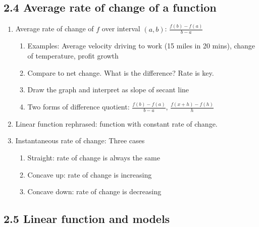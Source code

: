 \documentclass{article}
\newcommand{\ds}{\displaystyle}
\begin{document}
\subsection{2.4 Average rate of change of a function}

\begin{enumerate}
\item Average rate of change of $f$ over interval $(a,b)$: $\ds\frac{f(b)-f(a)}{b-a}$
\begin{enumerate}
\item Examples: Average velocity driving to work (15 miles in 20 mins), change of temperature, profit growth
\item Compare to net change. What is the difference? Rate is key. 
\item Draw the graph and interpret as slope of secant line
\item Two forms of difference quotient: $\ds\frac{f(b)-f(a)}{b-a}$, $\ds\frac{f(x+h)-f(h)}{h}$
\end{enumerate}
\item Linear function rephrased: function with constant rate of change.
\item Instantaneous rate of change: Three cases
\begin{enumerate}
\item Straight: rate of change is always the same 
\item Concave up: rate of change is increasing 
\item Concave down: rate of change is decreasing
\end{enumerate}
\end{enumerate}

\subsection{2.5 Linear function and models}
\end{document}
